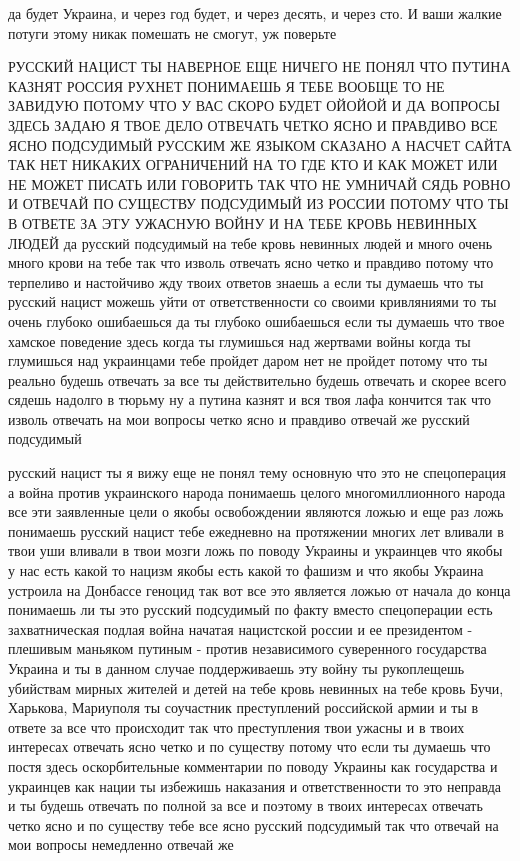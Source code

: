да будет Украина, и через год будет, и через десять, и через сто. И ваши жалкие
потуги этому никак помешать не смогут, уж поверьте

РУССКИЙ НАЦИСТ ТЫ НАВЕРНОЕ ЕЩЕ НИЧЕГО НЕ ПОНЯЛ ЧТО ПУТИНА КАЗНЯТ РОССИЯ РУХНЕТ
ПОНИМАЕШЬ Я ТЕБЕ ВООБЩЕ ТО НЕ ЗАВИДУЮ ПОТОМУ ЧТО У ВАС СКОРО БУДЕТ ОЙОЙОЙ И ДА
ВОПРОСЫ ЗДЕСЬ ЗАДАЮ Я ТВОЕ ДЕЛО ОТВЕЧАТЬ ЧЕТКО ЯСНО И ПРАВДИВО ВСЕ ЯСНО
ПОДСУДИМЫЙ РУССКИМ ЖЕ ЯЗЫКОМ СКАЗАНО А НАСЧЕТ САЙТА ТАК НЕТ НИКАКИХ ОГРАНИЧЕНИЙ
НА ТО ГДЕ КТО И КАК МОЖЕТ ИЛИ НЕ МОЖЕТ ПИСАТЬ ИЛИ ГОВОРИТЬ ТАК ЧТО НЕ УМНИЧАЙ
СЯДЬ РОВНО И ОТВЕЧАЙ ПО СУЩЕСТВУ ПОДСУДИМЫЙ ИЗ РОССИИ ПОТОМУ ЧТО ТЫ В ОТВЕТЕ ЗА
ЭТУ УЖАСНУЮ ВОЙНУ И НА ТЕБЕ КРОВЬ НЕВИННЫХ ЛЮДЕЙ да русский подсудимый на тебе
кровь невинных людей и много очень много крови на тебе так что изволь отвечать
ясно четко и правдиво потому что терпеливо и настойчиво жду твоих ответов
знаешь а если ты думаешь что ты русский нацист можешь уйти от ответственности
со своими кривляниями то ты очень глубоко ошибаешься да ты глубоко ошибаешься
если ты думаешь что твое хамское поведение здесь когда ты глумишься над
жертвами войны когда ты глумишься над украинцами тебе пройдет даром нет не
пройдет потому что ты реально будешь отвечать за все ты действительно будешь
отвечать и скорее всего сядешь надолго в тюрьму ну а путина казнят и вся твоя
лафа кончится так что изволь отвечать на мои вопросы четко ясно и правдиво
отвечай же русский подсудимый

русский нацист ты я вижу еще не понял тему основную что это не спецоперация а
война против украинского народа понимаешь целого многомиллионного народа все
эти заявленные цели о якобы освобождении являются ложью и еще раз ложь
понимаешь русский нацист тебе ежедневно на протяжении многих лет вливали в твои
уши вливали в твои мозги ложь по поводу Украины и украинцев что якобы у нас
есть какой то нацизм якобы есть какой то фашизм и что якобы Украина устроила на
Донбассе геноцид так вот все это является ложью от начала до конца понимаешь ли
ты это русский подсудимый по факту вместо спецоперации есть захватническая
подлая война начатая нацистской россии и ее президентом - плешивым маньяком
путиным - против независимого суверенного государства Украина и ты в данном
случае поддерживаешь эту войну ты рукоплещешь убийствам мирных жителей и детей
на тебе кровь невинных на тебе кровь Бучи, Харькова, Мариуполя ты соучастник
преступлений российской армии и ты в ответе за все что происходит так что
преступления твои ужасны и в твоих интересах отвечать ясно четко и по существу
потому что если ты думаешь что постя здесь оскорбительные комментарии по поводу
Украины как государства и украинцев как нации ты избежишь наказания и
ответственности то это неправда и ты будешь отвечать по полной за все и поэтому
в твоих интересах отвечать четко ясно и по существу тебе все ясно русский
подсудимый так что отвечай на мои вопросы немедленно отвечай же

